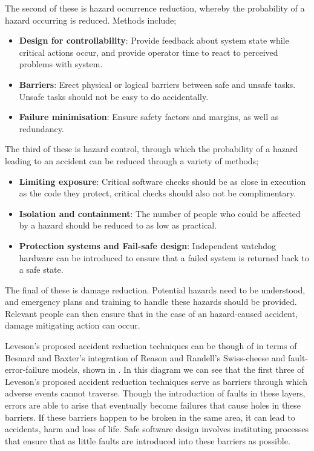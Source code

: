 \documentclass{cshonours}
\begin{document}
The second of these is hazard occurrence reduction, whereby the probability of a hazard occurring is reduced. Methods include;
 \begin{itemize}
  \item \textbf{Design for controllability}: Provide feedback about system state while critical actions occur, and provide operator time to react to perceived problems with system.
  \item \textbf{Barriers}: Erect physical or logical barriers between safe and unsafe tasks. Unsafe tasks should not be easy to do accidentally.
  \item \textbf{Failure minimisation}: Ensure safety factors and margins, as well as redundancy.
 \end{itemize}
 
The third of these is hazard control, through which the probability of a hazard leading to an accident can be reduced through a variety of methods;
 \begin{itemize}
  \item \textbf{Limiting exposure}: Critical software checks should be as close in execution as the code they protect, critical checks should also not be complimentary.
  \item \textbf{Isolation and containment}: The number of people who could be affected by a hazard should be reduced to as low as practical.
  \item \textbf{Protection systems and Fail-safe design}: Independent watchdog hardware can be introduced to ensure that a failed system is returned back to a safe state.
 \end{itemize}

The final of these is damage reduction. Potential hazards need to be understood, and emergency plans and training to handle these hazards should be provided. Relevant people can then ensure that in the case of an hazard-caused accident, damage mitigating action can occur.

Leveson's proposed accident reduction techniques can be though of in terms of Besnard and Baxter's \cite{besnard2003human} integration of Reason and Randell's Swiss-cheese and fault-error-failure models, shown in . In this diagram we can see that the first three of Leveson's proposed accident reduction techniques serve as barriers through which adverse events cannot traverse. Though the introduction of faults in these layers, errors are able to arise that eventually become failures that cause holes in these barriers. If these barriers happen to be broken in the same area, it can lead to accidents, harm and loss of life. Safe software design involves instituting processes that ensure that as little faults are introduced into these barriers as possible.
\end{document}
